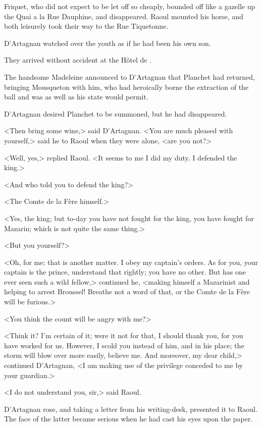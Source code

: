 Friquet, who did not expect to be let off so cheaply, bounded off like a gazelle up the Quai a la Rue Dauphine, and disappeared. Raoul mounted his horse, and both leisurely took their way to the Rue Tiquetonne.

D'Artagnan watched over the youth as if he had been his own son.

They arrived without accident at the Hôtel de .

The handsome Madeleine announced to D'Artagnan that Planchet had returned, bringing Mousqueton with him, who had heroically borne the extraction of the ball and was as well as his state would permit.

D'Artagnan desired Planchet to be summoned, but he had disappeared.

<Then bring some wine,> said D'Artagnan. <You are much pleased with yourself,> said he to Raoul when they were alone, <are you not?>

<Well, yes,> replied Raoul. <It seems to me I did my duty. I defended the king.>

<And who told you to defend the king?>

<The Comte de la Fère himself.>

<Yes, the king; but to-day you have not fought for the king, you have fought for Mazarin; which is not quite the same thing.>

<But you yourself?>

<Oh, for me; that is another matter. I obey my captain's orders. As for you, your captain is the prince, understand that rightly; you have no other. But has one ever seen such a wild fellow,> continued he, <making himself a Mazarinist and helping to arrest Broussel! Breathe not a word of that, or the Comte de la Fère will be furious.>

<You think the count will be angry with me?>

<Think it? I'm certain of it; were it not for that, I should thank you, for you have worked for us. However, I scold you instead of him, and in his place; the storm will blow over more easily, believe me. And moreover, my dear child,> continued D'Artagnan, <I am making use of the privilege conceded to me by your guardian.>

<I do not understand you, sir,> said Raoul.

D'Artagnan rose, and taking a letter from his writing-desk, presented it to Raoul. The face of the latter became serious when he had cast his eyes upon the paper.

